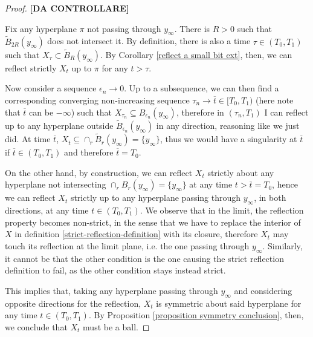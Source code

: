\begin{proof}
	{\Large \textbf{[DA CONTROLLARE]}}
	
	Fix any hyperplane $\pi$ not passing through $y_\infty$. There is $R>0$ such that $ \tilde{B}_{2R}(y_\infty)$ does not intersect it. By definition, there is also a time  $\tau \in  (T_0, T_1)$ such that $X_\tau \subset \tilde{B}_R(y_\infty)$. 
	By Corollary \ref{reflect a small bit ext}, then, we can reflect strictly $X_t$ up to $\pi$ for any $t>\tau$. 
	
	Now consider a sequence  $\epsilon_n\rightarrow 0$. Up to a subsequence, we can then find a corresponding converging non-increasing sequence $\tau_n\rightarrow \overline{t}\in [T_0, T_1)$ (here note that $\overline{t}$ can be $-\infty$) such that $X_{\tau_n}\subseteq B_{\epsilon_n}(y_\infty)$, therefore in $(\tau_n, T_1)$ I can reflect up to any hyperplane outside  $\tilde{B}_{\epsilon_n}(y_\infty)$ in any direction, reasoning like we just did. At time $\overline{t}$, $X_{\overline{t}} \subseteq \cap_r  \tilde{B}_{r}(y_\infty) = \{y_\infty\}$, thus we would have a singularity at $\overline{t}$ if  $\overline{t}\in(T_0, T_1)$ and therefore $\overline{t}=T_0$. 
	
	On the other hand, by construction, we can reflect $X_{t}$ strictly about any hyperplane not intersecting $\cap_r B_{r}(y_\infty) = \{y_\infty\}$ at any time $t>\overline{t}=T_0$, hence we can reflect $X_{t}$ strictly up to any hyperplane passing through $y_\infty$, in both directions, at any  time $t\in (T_0, T_1)$. We observe that in the limit, the reflection property becomes non-strict, in the sense that we have to replace the interior of $X$ in definition \ref{strict-reflection-definition} with its closure, therefore $X_{t}$ may touch its reflection at the limit plane, i.e. the one passing through $y_\infty$. Similarly, it cannot be that the other condition is the one causing the strict reflection definition to fail, as the other condition stays instead strict. 
	
	This implies that, taking any hyperplane passing through $y_\infty$ and considering opposite directions for the reflection, $X_{t}$ is symmetric about said hyperplane for any time $t\in (T_0, T_1)$. By Proposition \ref{proposition symmetry conclusion}, then, we conclude that $X_{t}$ must be a ball.	
\end{proof}
